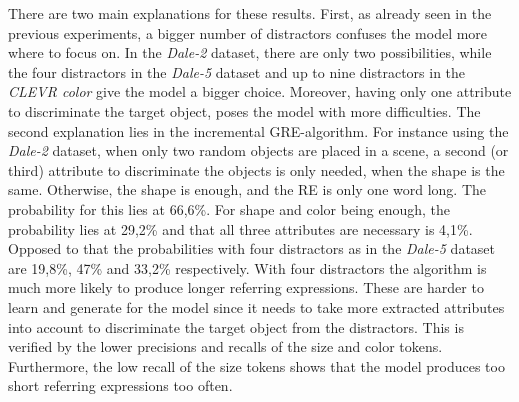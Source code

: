 There are two main explanations for these results.
First, as already seen in the previous experiments, a bigger number of distractors confuses the model more where to focus on.
In the \emph{Dale-2} dataset, there are only two possibilities, while the four distractors in the \emph{Dale-5} dataset and up to nine distractors in the \emph{CLEVR color} give the model a bigger choice.
Moreover, having only one attribute to discriminate the target object, poses the model with more difficulties.
The second explanation lies in the incremental GRE-algorithm.
For instance using the \emph{Dale-2} dataset, when only two random objects are placed in a scene, a second (or third) attribute to discriminate the objects is only needed, when the shape is the same.
Otherwise, the shape is enough, and the RE is only one word long.
The probability for this lies at 66,6\%.
For shape and color being enough, the probability lies at 29,2\% and that all three attributes are necessary is 4,1\%.
Opposed to that the probabilities with four distractors as in the \emph{Dale-5} dataset are 19,8\%, 47\% and 33,2\% respectively.
With four distractors the algorithm is much more likely to produce longer referring expressions.
These are harder to learn and generate for the model since it needs to take more extracted attributes into account to discriminate the target object from the distractors.
This is verified by the lower precisions and recalls of the size and color tokens.
Furthermore, the low recall of the size tokens shows that the model produces too short referring expressions too often.
